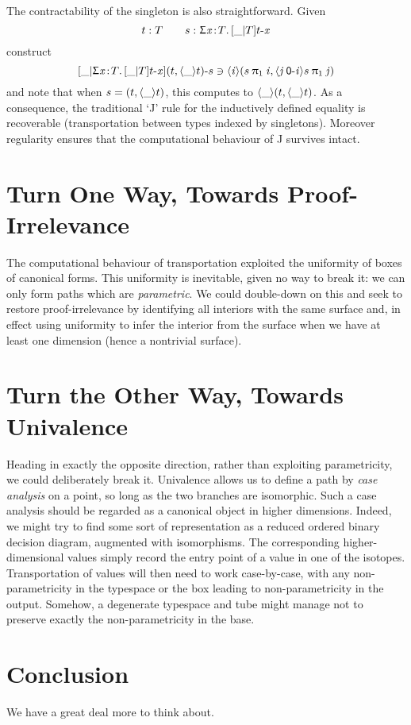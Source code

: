 \documentclass{article}
\begin{document}
The contractability of the singleton is also straightforward. Given
\[
t:T\qquad s:\SG\vx T\INR\_T{\ra t\vx}
\]
construct
\[
\INR\_{\SG\vx T\INR\_T{\ra t\vx}}{\ra{(\pa t\inr\_t)}s}
\ni \inr\vi{(\pa{\snd s\:\vi}{\inr{\vj\:\ra\pze i}{\snd s\:\vj}})}
\]
and note that when $s = (\pa t\inr\_t)$, this computes to
$\inr\_(\pa t\inr\_t)$. As a consequence, the traditional `J' rule for the
inductively defined equality is recoverable (transportation between types
indexed by singletons). Moreover regularity ensures that the computational
behaviour of J survives intact.


\section{Turn One Way, Towards Proof-Irrelevance}

The computational behaviour of transportation exploited the uniformity of boxes of canonical forms. This uniformity is inevitable, given no way to break it: we can only form paths which are \emph{parametric}. We could double-down on this and seek to restore proof-irrelevance
by identifying all interiors with the same surface and, in effect using uniformity to infer the interior from the surface when we have at least one dimension (hence a nontrivial surface).


\section{Turn the Other Way, Towards Univalence}

Heading in exactly the opposite direction, rather than exploiting parametricity, we could deliberately break it. Univalence allows us to define a path by \emph{case analysis} on a point, so long as the two branches are isomorphic. Such a case analysis should be regarded as a canonical object in higher dimensions. Indeed, we might try to find some sort of representation as a reduced ordered binary decision diagram, augmented with isomorphisms.
The corresponding higher-dimensional values simply record the entry point of a value in one of the isotopes. Transportation of values will then need to work case-by-case, with any
non-parametricity in the typespace or the box leading to non-parametricity in the
output. Somehow, a degenerate typespace and tube might manage not to preserve exactly
the non-parametricity in the base.

\section{Conclusion}

We have a great deal more to think about.
\end{document}
